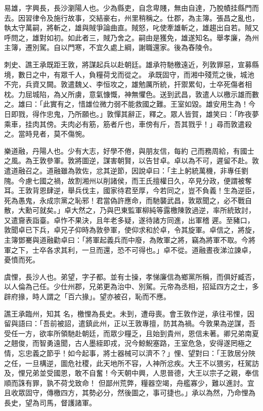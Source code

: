 \begin{pinyinscope}
 易雄，字興長，長沙瀏陽人也。少為縣吏，自念卑賤，無由自達，乃脫幘挂縣門而去。因習律令及施行故事，交結豪右，州里稍稱之。仕郡，為主簿。張昌之亂也，執太守萬嗣，將斬之，雄與賊爭論曲直。賊怒，叱使牽雄斬之，雄趨出自若。賊又呼問之，雄對如初。如此者三，賊乃舍之。嗣由是獲免，雄遂知名。舉孝廉，為州主簿，遷別駕。自以門寒，不宜久處上綱，謝職還家。後為舂陵令。



 刺史、譙王承既距王敦，將謀起兵以赴朝廷。雄承符馳檄遠近，列敦罪惡，宣募縣境，數日之中，有眾千人，負糧荷戈而從之。
 承既固守，而湘中殘荒之後，城池不完，兵資又闕。敦遣魏乂、李恒攻之，雄勉厲所統，扞禦累旬，士卒死傷者相枕。力屈城陷，為乂所虜，意氣慷慨，神無懼色。送到武昌，敦遣人以檄示雄而數之。雄曰：「此實有之，惜雄位微力弱不能救國之難。王室如毀。雄安用生為！今日即戮，得作忠鬼，乃所願也。」敦憚其辭正，釋之。眾人皆賀，雄笑曰：「昨夜夢乘車，挂肉其傍。夫肉必有筋，筋者斤也，車傍有斤，吾其戮乎！」尋而敦遣殺之。當時見者，莫不傷惋。



 樂道融，丹陽人也。少有大志，好學不倦，與朋友信，每約
 己而務周給，有國士之風。為王敦參軍。敦將圖逆，謀害朝賢，以告甘卓。卓以為不可，遲留不赴。敦遣道融召之。道融雖為敦佐，忿其逆節，因說卓曰：「主上躬統萬機，非專任劉隗。今慮七國之禍，故割湘州以削諸侯，而王氏擅權日久，卒見分政，便謂被奪耳。王敦背恩肆逆，舉兵伐主，國家待君至厚，今若同之，豈不負義！生為逆臣，死為愚鬼，永成宗黨之恥邪！君當偽許應命，而馳襲武昌，敦眾聞之，必不戰自散，大勳可就矣。」卓大然之，乃與巴東監軍柳純等露檄陳敦過逆，率所統致討，又遣齎表詣臺。卓怍不果決，且年老多疑，遂待諸方同進，出軍稽
 遲。至豬口，敦聞卓已下兵，卓兄子仰時為敦參軍，使仰求和於卓，令其旋軍。卓信之，將旋，主簿鄧騫與道融勸卓曰：「將軍起義兵而中廢，為敗軍之將，竊為將軍不取。今將軍之下，士卒各求其利，一旦而還，恐不可得也。」卓不從。道融晝夜涕泣諫卓，憂憤而死。



 虞悝，長沙人也。弟望，字子都。並有士操，孝悌廉信為鄉黨所稱，而俱好臧否，以人倫為己任。少仕州郡，兄弟更為治中、別駕。元帝為丞相，招延四方之士，多辟府掾，時人謂之「百六掾」。望亦被召，恥而不應。



 譙王承臨州，知其
 名，檄悝為長史。未到，遭母喪。會王敦作逆，承往弔悝，因留與語曰：「吾前被詔，遣鎮此州，正以王敦專擅，防其為禍。今敦果為逆謀，吾受任一方，欲率所領馳赴朝廷，而眾少糧乏，且始到貴州，恩信未著。卿兄弟南夏之翹俊，而智勇遠聞，古人墨絰即戎，況今鯨鯢塞路，王室危急，安得遂罔極之情，忘忠義之節乎！如今起事，將士器械可以濟不？」悝、望對曰：「王敦居分陜之任，一旦構逆，圖危社稷，此天地所不容，人神所忿疾。大王不以猥劣，枉駕訪及，悝兄弟並受國恩，敢不自奮！今天朝中興，人思晉德，大王以宗子之親，奉信順而誅有罪，孰不荷戈致命！
 但鄙州荒弊，糧器空竭，舟艦寡少，難以進討。宜且收眾固守，傳檄四方，其勢必分，然後圖之，事可捷也。」承以為然，乃命悝為長史，望為司馬，督護諸軍。




\end{pinyinscope}
